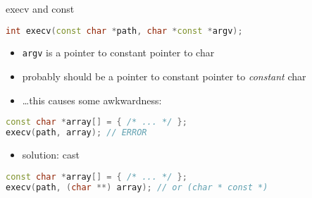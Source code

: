 \begin{frame}[fragile,label=execvConst]{execv and const}
\begin{lstlisting}[language=C++,style=small]
int execv(const char *path, char *const *argv);
\end{lstlisting}
\begin{itemize}
    \item \texttt{argv} is a pointer to constant pointer to char
    \item probably should be a pointer to constant pointer to \textit{constant} char
    \item \ldots this causes some awkwardness:
\end{itemize}
\begin{lstlisting}[language=C++,style=small]
const char *array[] = { /* ... */ };
execv(path, array); // ERROR
\end{lstlisting}
    \begin{itemize}
    \item solution: cast
    \end{itemize}
\begin{lstlisting}[language=C++,style=small]
const char *array[] = { /* ... */ };
execv(path, (char **) array); // or (char * const *)
\end{lstlisting}
\end{frame}
